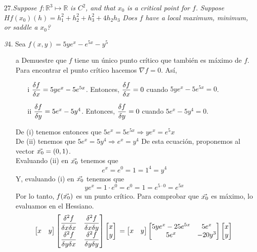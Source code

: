\documentclass[a4paper,12pt]{article}
\begin{document}
	\textit{\textbf{$27.$}Suppose $f: \mathbb{R}^3 \mapsto \mathbb{R}$ is $C^2$, and that $x_{0}$ is a critical point for $f$. Suppose $Hf (x_{0})(h) = h_{1}^2 + h_{2}^2 + h_{3}^2 + 4h_{2}h_{3}$ Does $f$ have a local maximum, minimum, or saddle a $x_{0}$?}\

\textit 34. Sea $f(x,y) = 5ye^x - e^{5x} -y^5$
\begin{itemize}
	\item[a] Demuestre que  $f$ tiene un único punto crítico que también es máximo de $f$.
	Para encontrar el punto crítico hacemos $\nabla f = 0$. Así,
	\begin{itemize}
		\item[i] $\dfrac{\delta f}{\delta x} = 5ye^x-5e^{5x}$. Entonces, $\dfrac{\delta f}{\delta x} = 0$ cuando $5ye^x-5e^{5x} = 0$.
		\item[ii]$\dfrac{\delta f}{\delta y} = 5e^x-5y^4$. Entonces, $\dfrac{\delta f}{\delta y} = 0$ cuando $5e^x-5y^4 = 0$.
	\end{itemize}
	De (i) tenemos entonces que $5e^x = 5e^{5x} \Rightarrow ye^x = e^5x$\\
	De (ii) tenemos que $5e^x = 5y^4 \Rightarrow e^x = y^4$ De esta ecuación, proponemos al vector $\vec{x_0} = (0,1)$.\\
	Evaluando (ii) en $\vec{x_0}$ tenemos que
	$$ e^x = e^0 = 1 = 1^4 = y^4$$
	Y, evaluando (i) en $\vec{x_0}$ tenemos que
	$$ye^x = 1\cdot e^0 = e^0 = 1 = e^{5\cdot 0} = e^{5x}$$
	Por lo tanto, $f(\vec{x_0})$ es un punto crítico.
	Para comprobar que $\vec{x_0}$ es máximo, lo evaluamos en el Hessiano.
	\[
	\begin{bmatrix}
	x & y
	\end{bmatrix}
	\begin{bmatrix}
	    \dfrac{\delta ^2 f}{\delta x \delta x} & \dfrac{\delta ^2 f}{\delta x \delta y}\\
		\dfrac{\delta ^2 f}{\delta y \delta x} & \dfrac{\delta ^2 f}{\delta y \delta y}\\
	\end{bmatrix}
	\begin{bmatrix}
	x \\ y
	\end{bmatrix}\\
	=
	\begin{bmatrix}
	x & y
	\end{bmatrix}
	\begin{bmatrix}
	    5ye^x - 25e^{5x} & 5e^x\\
		5e^x & -20y^3\\
	\end{bmatrix}
	\begin{bmatrix}
	x \\ y
	\end{bmatrix}\\
\]
\end{itemize}
\end{document}
